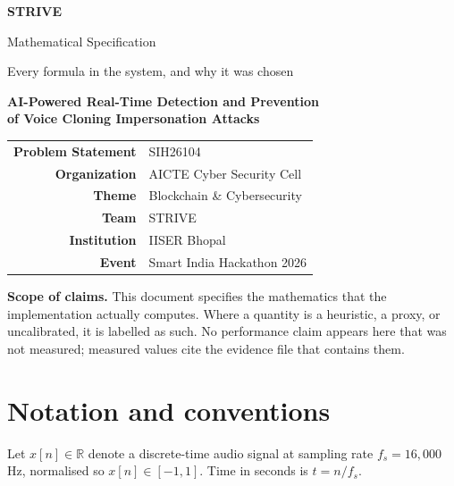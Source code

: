\documentclass[11pt,a4paper]{article}
\newcommand{\R}{\mathbb{R}}
\begin{document}
\begin{titlepage}
\centering
\vspace*{2cm}
{\Huge\bfseries\color{strivenavy} STRIVE\par}
\vspace{0.6cm}
{\LARGE\color{striveteal} Mathematical Specification\par}
\vspace{0.4cm}
{\large Every formula in the system, and why it was chosen\par}
\vspace{2cm}
{\large\bfseries AI-Powered Real-Time Detection and Prevention\\of Voice Cloning Impersonation Attacks\par}
\vspace{1.5cm}
\begin{tabular}{rl}
\textbf{Problem Statement} & SIH26104\\
\textbf{Organization} & AICTE Cyber Security Cell\\
\textbf{Theme} & Blockchain \& Cybersecurity\\
\textbf{Team} & STRIVE\\
\textbf{Institution} & IISER Bhopal\\
\textbf{Event} & Smart India Hackathon 2026\\
\end{tabular}
\vfill
\begin{tcolorbox}[colback=red!3,colframe=strivewarn,width=0.92\textwidth]
\textbf{Scope of claims.} This document specifies the mathematics that the
implementation actually computes. Where a quantity is a heuristic, a proxy, or
uncalibrated, it is labelled as such. No performance claim appears here that was
not measured; measured values cite the evidence file that contains them.
\end{tcolorbox}
\vspace{1cm}
\end{titlepage}

\tableofcontents
\newpage

\section{Notation and conventions}

Let $x[n] \in \R$ denote a discrete-time audio signal at sampling rate
$f_s = 16{,}000$\,Hz, normalised so $x[n] \in [-1,1]$. Time in seconds is
$t = n/f_s$.
\end{document}
